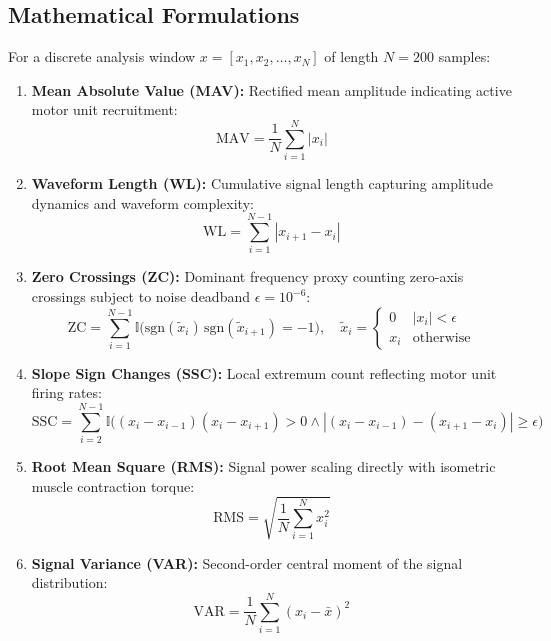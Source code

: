 \documentclass[11pt,a4paper]{article}
\begin{document}
\subsection{Mathematical Formulations}
For a discrete analysis window $x = [x_1, x_2, \dots, x_N]$ of length $N = 200$ samples:
\begin{enumerate}
    \item \textbf{Mean Absolute Value (MAV):} Rectified mean amplitude indicating active motor unit recruitment:
    \begin{equation}
        \text{MAV} = \frac{1}{N} \sum_{i=1}^{N} |x_i|
    \end{equation}
    \item \textbf{Waveform Length (WL):} Cumulative signal length capturing amplitude dynamics and waveform complexity:
    \begin{equation}
        \text{WL} = \sum_{i=1}^{N-1} |x_{i+1} - x_i|
    \end{equation}
    \item \textbf{Zero Crossings (ZC):} Dominant frequency proxy counting zero-axis crossings subject to noise deadband $\epsilon = 10^{-6}$:
    \begin{equation}
        \text{ZC} = \sum_{i=1}^{N-1} \mathbb{I}\Big( \text{sgn}(\tilde{x}_i)\,\text{sgn}(\tilde{x}_{i+1}) = -1 \Big), \quad \tilde{x}_i = \begin{cases} 0 & |x_i| < \epsilon \\ x_i & \text{otherwise} \end{cases}
    \end{equation}
    \item \textbf{Slope Sign Changes (SSC):} Local extremum count reflecting motor unit firing rates:
    \begin{equation}
        \text{SSC} = \sum_{i=2}^{N-1} \mathbb{I}\Big( (x_i - x_{i-1})(x_i - x_{i+1}) > 0 \land |(x_i - x_{i-1}) - (x_{i+1} - x_i)| \ge \epsilon \Big)
    \end{equation}
    \item \textbf{Root Mean Square (RMS):} Signal power scaling directly with isometric muscle contraction torque:
    \begin{equation}
        \text{RMS} = \sqrt{\frac{1}{N} \sum_{i=1}^{N} x_i^2}
    \end{equation}
    \item \textbf{Signal Variance (VAR):} Second-order central moment of the signal distribution:
    \begin{equation}
        \text{VAR} = \frac{1}{N} \sum_{i=1}^{N} (x_i - \bar{x})^2
    \end{equation}
\end{enumerate}
\end{document}
